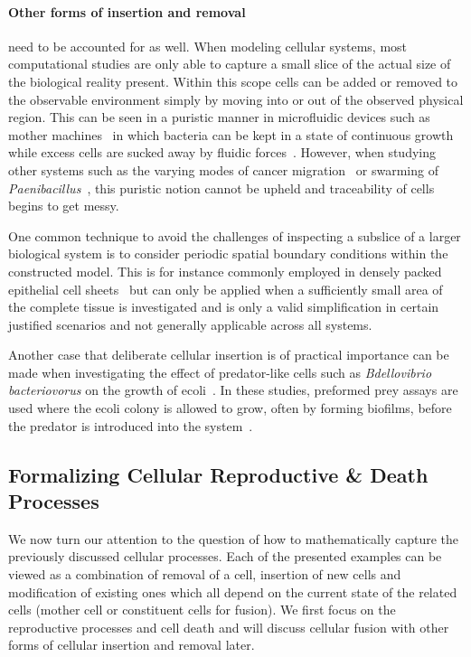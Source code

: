 \paragraph{Other forms of insertion and removal} need to be accounted for as well.
When modeling cellular systems, most computational studies are only able to capture a small slice of
the actual size of the biological reality present.
Within this scope cells can be added or removed to the observable environment simply by moving
into or out of the observed physical region.
This can be seen in a puristic manner in microfluidic devices such as mother
machines~\cite{Wang2010Robust} in which bacteria can be kept in a state of continuous
growth~\cite{Yang2018,Kaiser2018} while excess cells are sucked away by fluidic
forces~\cite{Grnberger2014}.
However, when studying other systems such as the varying modes of cancer migration~\cite{Friedl2003}
or swarming of \textit{Paenibacillus}~\cite{Ingham2008}, this puristic notion cannot be upheld and
traceability of cells begins to get messy.

One common technique to avoid the challenges of inspecting a subslice of a larger biological system
is to consider periodic spatial boundary conditions within the constructed model.
This is for instance commonly employed in densely packed epithelial cell
sheets~\cite{Bi2015,Bi2016,Tong2022} but can only be applied when a sufficiently small area of the
complete tissue is investigated and is only a valid simplification in certain justified scenarios
and not generally applicable across all systems.

Another case that deliberate cellular insertion is of practical importance can be made when
investigating the effect of predator-like cells such as \textit{Bdellovibrio bacteriovorus} on the
growth of \ac{ecoli}~\cite{Sockett2009}.
In these studies, preformed prey assays are used where the \ac{ecoli} colony is allowed to grow,
often by forming biofilms, before the predator is introduced into the system~\cite{Kadouri2005}.

\subsection{Formalizing Cellular Reproductive \& Death Processes}
\label{subsec:theory-formalizing-cellular-reproduction}
We now turn our attention to the question of how to mathematically capture the previously discussed
cellular processes.
Each of the presented examples can be viewed as a combination of removal of a cell, insertion of
new cells and modification of existing ones which all depend on the current state of the related
cells (mother cell or constituent cells for fusion).
We first focus on the reproductive processes and cell death and will discuss cellular fusion with
other forms of cellular insertion and removal later.

